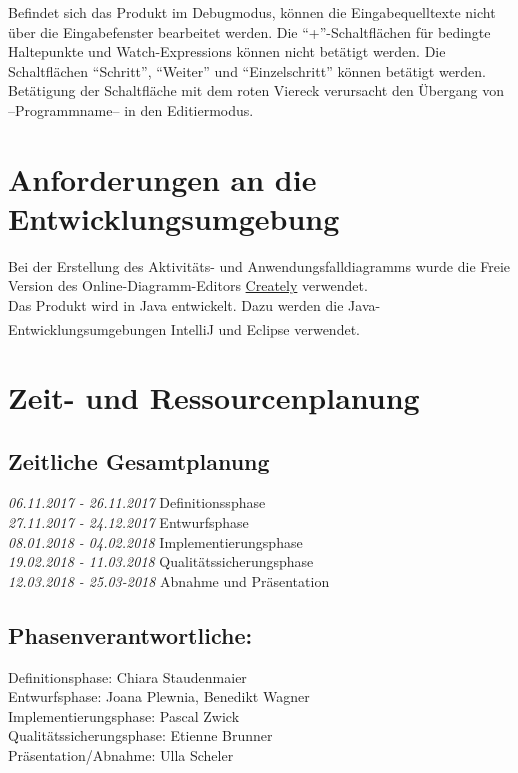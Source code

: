 \documentclass[parskip=full]{scrartcl}
\begin{document}
        Befindet sich das Produkt im \gls{Debugmodus}, können die Eingabequelltexte nicht
        über die Eingabefenster bearbeitet werden. Die \enquote{+}-Schaltflächen für bedingte Haltepunkte
        und \glspl{Watch-Expression} können nicht betätigt werden.
        Die Schaltflächen \enquote{Schritt}, \enquote{Weiter} und \enquote{Einzelschritt} können betätigt werden.
        Betätigung der Schaltfläche mit dem roten Viereck verursacht den Übergang von --Programmname-- in den Editiermodus.
        
\section{Anforderungen an die Entwicklungsumgebung}
Bei der Erstellung des Aktivitäts- und Anwendungsfalldiagramms wurde die Freie Version des Online-Diagramm-Editors \href{https://creately.com/}{Creately} verwendet.\\
Das Produkt wird in Java entwickelt. Dazu werden die Java-Entwicklungsumgebungen IntelliJ\textsuperscript{\textcopyright} und Eclipse\textsuperscript{\textcopyright} verwendet.\\

        
\section{Zeit- und Ressourcenplanung}
\subsection{Zeitliche Gesamtplanung}
\textit{06.11.2017 - 26.11.2017} Definitionssphase \\
\textit{27.11.2017 - 24.12.2017} Entwurfsphase \\
\textit{08.01.2018 - 04.02.2018} Implementierungsphase\\
\textit{19.02.2018 - 11.03.2018} Qualitätssicherungsphase\\
\textit{12.03.2018 - 25.03-2018} Abnahme und Präsentation

\subsection{Phasenverantwortliche:}
Definitionsphase: Chiara Staudenmaier\\
Entwurfsphase: Joana Plewnia, Benedikt Wagner\\
Implementierungsphase: Pascal Zwick\\
Qualitätssicherungsphase: Etienne Brunner\\
Präsentation/Abnahme: Ulla Scheler\\
\end{document}
